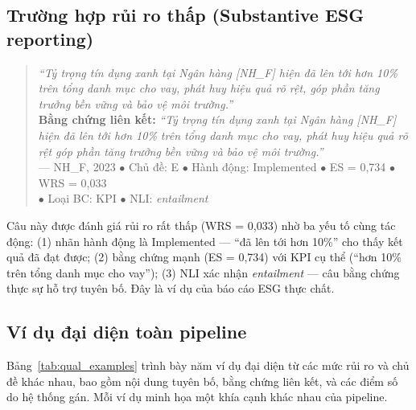 \subsection{Trường hợp rủi ro thấp (Substantive ESG reporting)}
\label{subsec:low_risk_case}

\begin{quote}
\textit{``Tỷ trọng tín dụng xanh tại Ngân hàng [NH\_F] hiện đã lên tới hơn 10\% trên tổng danh mục cho vay, phát huy hiệu quả rõ rệt, góp phần tăng trưởng bền vững và bảo vệ môi trường.''} \\
\textbf{Bằng chứng liên kết:} \textit{``Tỷ trọng tín dụng xanh tại Ngân hàng [NH\_F] hiện đã lên tới hơn 10\% trên tổng danh mục cho vay, phát huy hiệu quả rõ rệt góp phần tăng trưởng bền vững và bảo vệ môi trường.''} \\
--- NH\_F, 2023 \quad $\bullet$ Chủ đề: E \quad $\bullet$ Hành động: Implemented \quad $\bullet$ ES = 0,734 \quad $\bullet$ WRS = 0,033 \\
$\bullet$ Loại BC: KPI \quad $\bullet$ NLI: \textit{entailment}
\end{quote}

Câu này được đánh giá rủi ro rất thấp (WRS = 0,033) nhờ ba yếu tố cùng tác động: (1) nhãn hành động là Implemented --- ``đã lên tới hơn 10\%'' cho thấy kết quả đã đạt được; (2) bằng chứng mạnh (ES = 0,734) với KPI cụ thể (``hơn 10\% trên tổng danh mục cho vay''); (3) NLI xác nhận \textit{entailment} --- câu bằng chứng thực sự hỗ trợ tuyên bố. Đây là ví dụ của báo cáo ESG thực chất.


\subsection{Ví dụ đại diện toàn pipeline}
\label{subsec:representative_examples}

Bảng~\ref{tab:qual_examples} trình bày năm ví dụ đại diện từ các mức rủi ro và chủ đề khác nhau, bao gồm nội dung tuyên bố, bằng chứng liên kết, và các điểm số do hệ thống gán. Mỗi ví dụ minh họa một khía cạnh khác nhau của pipeline.

